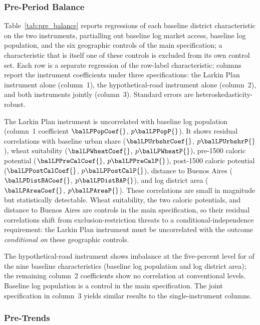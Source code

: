 \subsubsection{Pre-Period Balance}
\label{sec:pre_balance}

Table~\ref{tab:pre_balance} reports regressions of each baseline
district characteristic on the two instruments, partialling out
baseline log market access, baseline log population, and the six
geographic controls of the main specification; a characteristic that
is itself one of these controls is excluded from its own control
set. Each row is a
separate regression of the row-label characteristic; columns report
the instrument coefficients under three specifications: the Larkin
Plan instrument alone (column~1), the hypothetical-road instrument
alone (column~2), and both instruments jointly (column~3). Standard
errors are heteroskedasticity-robust.

The Larkin Plan instrument is uncorrelated with baseline log
population (column~1 coefficient $\balLPPopCoef{}$, $p\balLPPopP{}$).
It shows residual
correlations with baseline urban share ($\balLPUrbshrCoef{}$,
$p\balLPUrbshrP{}$), wheat
suitability ($\balLPWheatCoef{}$, $p\balLPWheatP{}$), pre-1500 caloric potential
($\balLPPreCalCoef{}$, $p\balLPPreCalP{}$), post-1500 caloric potential ($\balLPPostCalCoef{}$,
$p\balLPPostCalP{}$), distance to Buenos Aires ($\balLPDistBACoef{}$, $p\balLPDistBAP{}$), and log
district area ($\balLPAreaCoef{}$, $p\balLPAreaP{}$). These correlations are small in
magnitude but statistically detectable. Wheat suitability, the two
caloric potentials, and distance to Buenos Aires are controls in the
main specification, so their residual
correlations shift from exclusion-restriction threats to a
conditional-independence requirement: the Larkin Plan instrument must
be uncorrelated with the outcome \emph{conditional on} these
geographic controls.

The hypothetical-road instrument shows imbalance at the five-percent
level for \balHypoNImbalanced{} of the nine baseline characteristics
(baseline log population and log district area); the remaining
column~2 coefficients show no correlation at conventional levels.
Baseline log population is a control in the main specification. The
joint specification in
column~3 yields similar results to the single-instrument columns.



\subsubsection{Pre-Trends}
\label{sec:pre_trends}

